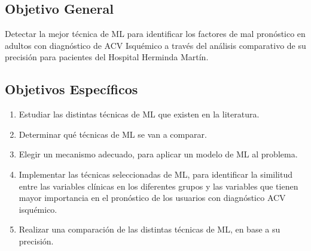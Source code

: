 \doublespacing
\subsection{Objetivo General}
Detectar la mejor técnica de ML para identificar los factores de mal pronóstico en adultos con diagnóstico de ACV Isquémico a través del análisis comparativo de su precisión para pacientes del Hospital Herminda Martín.\\

\doublespacing
\subsection{Objetivos Específicos}
\begin{enumerate}
	\renewcommand{\theenumi}{\Roman{enumi}} %
	\item Estudiar las distintas técnicas de ML que existen en la literatura. 
	\item Determinar qué técnicas de ML se van a comparar.
	\item Elegir un mecanismo adecuado, para aplicar un modelo de ML  al problema.
	\item Implementar las técnicas seleccionadas de ML, para identificar la similitud entre las variables clínicas en los diferentes grupos y  las variables que tienen mayor importancia en el pronóstico de los usuarios con diagnóstico ACV isquémico.
	\item Realizar una comparación de las distintas técnicas de ML, en base a su precisión.
\end{enumerate}